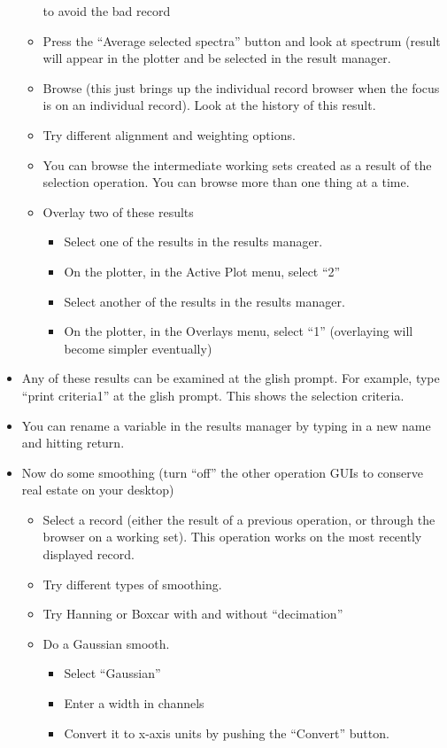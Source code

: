 \begin{itemize}
\begin{itemize}
to avoid the bad record
\item Press the ``Average selected spectra'' button and look at spectrum
(result will appear in the plotter and be selected in the result manager.
\item Browse (this just brings up the individual record browser when the focus
is on an individual record).  Look at the history of this result.
\item Try different alignment and weighting options.
\item You can browse the intermediate working sets created as a result of
the selection operation.  You can browse more than one thing at a time.
\item Overlay two of these results
\begin{itemize}
\item Select one of the results in the results manager.
\item On the plotter, in the Active Plot menu, select ``2''
\item Select another of the results in the results manager.
\item On the plotter, in the Overlays menu, select ``1'' 
(overlaying will become simpler eventually)
\end{itemize}
\end{itemize}
\item Any of these results can be examined at the glish prompt.
For example, type ``print criteria1'' at the glish prompt.  This shows
the selection criteria.
\item You can rename a variable in the results manager by typing in a
new name and hitting return.
\item Now do some smoothing (turn ``off'' the other operation GUIs to
conserve real estate on your desktop)
\begin{itemize}
\item Select a record (either the result of a previous operation, or
through the browser on a working set).  This operation works on the
most recently displayed record.
\item Try different types of smoothing.
\item Try Hanning or Boxcar with and without ``decimation''
\item Do a Gaussian smooth.
\begin{itemize}
\item Select ``Gaussian''
\item Enter a width in channels
\item Convert it to x-axis units by pushing the ``Convert'' button.

\end{itemize}
\end{itemize}
\end{itemize}
